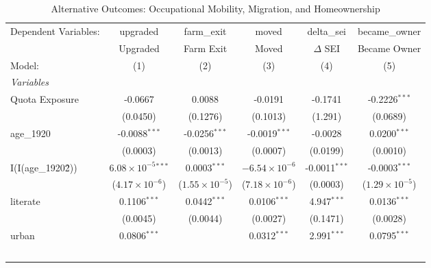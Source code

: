 
\begin{table}[htbp]
   \caption{\label{tab:altoutcomes} Alternative Outcomes: Occupational Mobility, Migration, and Homeownership}
   \centering
   \small
   \begin{adjustbox}{max width=\textwidth}
   \begin{tabular}{lccccc}
      \tabularnewline \midrule \midrule
      Dependent Variables: & upgraded                      & farm\_exit              & moved                   & delta\_sei      & became\_owner\\   
                           & Upgraded                      & Farm Exit               & Moved                   & $\Delta$ SEI    & Became Owner \\   
      Model:               & (1)                           & (2)                     & (3)                     & (4)             & (5)\\  
      \midrule
      \emph{Variables}\\
      Quota Exposure       & -0.0667                       & 0.0088                  & -0.0191                 & -0.1741         & -0.2226$^{***}$\\   
                           & (0.0450)                      & (0.1276)                & (0.1013)                & (1.291)         & (0.0689)\\   
      age\_1920            & -0.0088$^{***}$               & -0.0256$^{***}$         & -0.0019$^{***}$         & -0.0028         & 0.0200$^{***}$\\   
                           & (0.0003)                      & (0.0013)                & (0.0007)                & (0.0199)        & (0.0010)\\   
      I(I(age\_1920\^2))   & $6.08\times 10^{-5}$$^{***}$  & 0.0003$^{***}$          & $-6.54\times 10^{-6}$   & -0.0011$^{***}$ & -0.0003$^{***}$\\   
                           & ($4.17\times 10^{-6}$)        & ($1.55\times 10^{-5}$)  & ($7.18\times 10^{-6}$)  & (0.0003)        & ($1.29\times 10^{-5}$)\\    
      literate             & 0.1106$^{***}$                & 0.0442$^{***}$          & 0.0106$^{***}$          & 4.947$^{***}$   & 0.0136$^{***}$\\   
                           & (0.0045)                      & (0.0044)                & (0.0027)                & (0.1471)        & (0.0028)\\   
      urban                & 0.0806$^{***}$                &                         & 0.0312$^{***}$          & 2.991$^{***}$   & 0.0795$^{***}$\\   
$$
\end{tabular}
\end{adjustbox}
\end{table}
